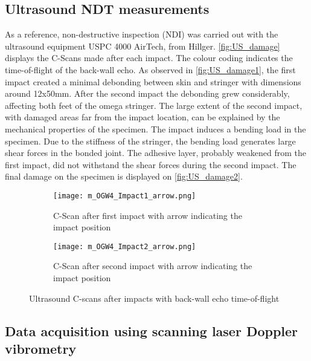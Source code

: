 \documentclass[times,final]{elsarticle}
\begin{document}
\subsection{Ultrasound NDT measurements}

As a reference, non-destructive inspection (NDI) was carried out with the ultrasound equipment USPC 4000 AirTech, from Hillger. \autoref{fig:US_damage} displays the C-Scans made after each impact. The colour coding indicates the time-of-flight of the back-wall echo. As observed in \autoref{fig:US_damage1}, the first impact created a minimal debonding between skin and stringer with dimensions around 12x50mm. After the second impact the debonding grew considerably, affecting both feet of the omega stringer. The large extent of the second impact, with damaged areas far from the impact location, can be explained by the mechanical properties of the specimen. The impact induces a bending load in the specimen. Due to the stiffness of the stringer, the bending load generates large shear forces in the bonded joint. The adhesive layer, probably weakened from the first impact, did not withstand the shear forces during the second impact. The final damage on the specimen is displayed on \autoref{fig:US_damage2}.

\begin{figure} [htp]
	\centering
	\begin{subfigure}[b]{\textwidth}
	\centering
		\texttt{[image: m\_OGW4\_Impact1\_arrow.png]}
		\caption{C-Scan after first impact with arrow indicating the impact position}
		\label{fig:US_damage1}
	\end{subfigure}
	
	\begin{subfigure}[b]{\textwidth}
	\centering
		\texttt{[image: m\_OGW4\_Impact2\_arrow.png]}
		\caption{C-Scan after second impact with arrow indicating the impact position}
		\label{fig:US_damage2}
	\end{subfigure}
	\caption{Ultrasound C-scans after impacts with back-wall echo time-of-flight}
	\label{fig:US_damage}
\end{figure}

\subsection{Data acquisition using scanning laser Doppler vibrometry}
\end{document}
